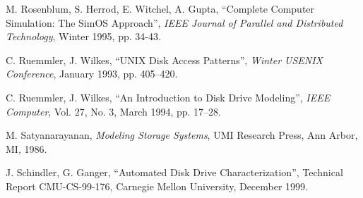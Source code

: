 \begin{thebibliography}{99}


M. Rosenblum, S. Herrod, E. Witchel, A. Gupta,
``Complete Computer Simulation: The SimOS Approach'',
{\it IEEE Journal of Parallel and Distributed Technology},
Winter 1995, pp. 34-43.


C. Ruemmler, J. Wilkes,
``UNIX Disk Access Patterns'',
{\it Winter USENIX Conference},
January 1993, pp. 405--420.



C. Ruemmler, J. Wilkes,
``An Introduction to Disk Drive Modeling'',
{\it IEEE Computer},
Vol. 27, No. 3, March 1994, pp. 17--28.



M. Satyanarayanan,
{\it Modeling Storage Systems},
UMI Research Press, Ann Arbor, MI, 1986.

J. Schindler, G. Ganger,
``Automated Disk Drive Characterization'',
Technical Report CMU-CS-99-176, Carnegie Mellon University,
December 1999.


\end{thebibliography}
